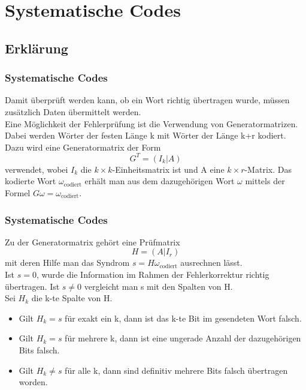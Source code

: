 \section{Systematische Codes}
\subsection{Erklärung}
\begin{frame}
	\frametitle{Systematische Codes}
	Damit überprüft werden kann, ob ein Wort richtig übertragen wurde, müssen zusätzlich Daten übermittelt werden.\\
	Eine Möglichkeit der Fehlerprüfung ist die Verwendung von Generatormatrizen.\\ 
	Dabei werden Wörter der festen Länge k mit Wörter der Länge k+r kodiert. Dazu wird eine Generatormatrix der Form \[G^T=\left(I_k|A\right)\] verwendet, wobei $I_k$ die $k \times k$-Einheitsmatrix ist und A eine $k \times r$-Matrix. Das kodierte Wort $\omega_{\text{codiert}}$ erhält man aus dem dazugehörigen Wort $\omega$ mittels der Formel $G\omega=\omega_{\text{codiert}}.$\\
\end{frame}
\begin{frame}
	\frametitle{Systematische Codes}
	Zu der Generatormatrix gehört eine Prüfmatrix \[H=\left(A|I_r\right)\] mit deren Hilfe man das Syndrom $s=H\omega_{\text{codiert}}$ ausrechnen lässt.\\ Ist $s=0$, wurde die Information im Rahmen der Fehlerkorrektur richtig übertragen. Ist $s\not = 0$ vergleicht man s mit den Spalten von H.\\ Sei $H_k$ die k-te Spalte von H.
	\begin{itemize}
	\item Gilt $H_k=s$ für exakt ein k, dann ist das k-te Bit im gesendeten Wort falsch.
	\item Gilt $H_k=s$ für mehrere k, dann ist eine ungerade Anzahl der dazugehörigen Bits falsch.
	\item Gilt $H_k\not=s$ für alle k, dann sind definitiv mehrere Bits falsch übertragen worden.
	\end{itemize}
\end{frame}
